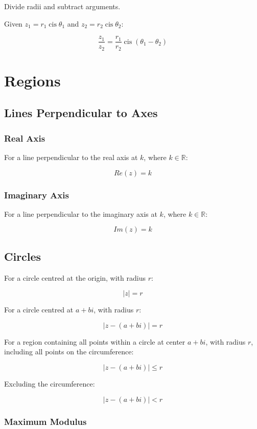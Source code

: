 \documentclass[a4paper,11pt]{article}
\DeclareMathOperator\cis{cis}
\begin{document}
Divide radii and subtract arguments.

Given $z_1 = r_1 \cis{\theta_1}$ and $z_2 = r_2 \cis{\theta_2}$:

$$
\frac{z_1}{z_2} = \frac{r_1}{r_2} \cis(\theta_1 - \theta_2)
$$




\section{Regions}

\subsection{Lines Perpendicular to Axes}

\subsubsection{Real Axis}

For a line perpendicular to the real axis at $k$, where $k \in \mathbb{R}$:

$$
Re(z) = k
$$


\subsubsection{Imaginary Axis}

For a line perpendicular to the imaginary axis at $k$, where $k \in \mathbb{R}$:

$$
Im(z) = k
$$


\subsection{Circles}

For a circle centred at the origin, with radius $r$:

$$
\lvert z \rvert = r
$$

For a circle centred at $a + bi$, with radius $r$:

$$
\lvert z - (a + bi) \rvert = r
$$

For a region containing all points within a circle at center $a + bi$, with
radius $r$, including all points on the circumference:

$$
\lvert z - (a + bi) \rvert \leq r
$$

Excluding the circumference:

$$
\lvert z - (a + bi) \rvert < r
$$


\subsubsection{Maximum Modulus}
\end{document}
